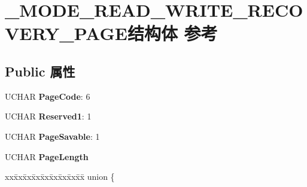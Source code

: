 \hypertarget{struct___m_o_d_e___r_e_a_d___w_r_i_t_e___r_e_c_o_v_e_r_y___p_a_g_e}{}\section{\+\_\+\+M\+O\+D\+E\+\_\+\+R\+E\+A\+D\+\_\+\+W\+R\+I\+T\+E\+\_\+\+R\+E\+C\+O\+V\+E\+R\+Y\+\_\+\+P\+A\+G\+E结构体 参考}
\label{struct___m_o_d_e___r_e_a_d___w_r_i_t_e___r_e_c_o_v_e_r_y___p_a_g_e}
\subsection*{Public 属性}
\begin{DoxyCompactItemize}
\item 
\mbox{\label{struct___m_o_d_e___r_e_a_d___w_r_i_t_e___r_e_c_o_v_e_r_y___p_a_g_e_a648291f6716c23a2b709e9ae1c104b01}} 
U\+C\+H\+AR {\bfseries Page\+Code}\+: 6
\item 
\mbox{\label{struct___m_o_d_e___r_e_a_d___w_r_i_t_e___r_e_c_o_v_e_r_y___p_a_g_e_ace117898b2d24fd6aeb8dc79e54c7b85}} 
U\+C\+H\+AR {\bfseries Reserved1}\+: 1
\item 
\mbox{\label{struct___m_o_d_e___r_e_a_d___w_r_i_t_e___r_e_c_o_v_e_r_y___p_a_g_e_a228df0011ede1443fd39cd00108b376f}} 
U\+C\+H\+AR {\bfseries Page\+Savable}\+: 1
\item 
\mbox{\label{struct___m_o_d_e___r_e_a_d___w_r_i_t_e___r_e_c_o_v_e_r_y___p_a_g_e_a677fd211d27cd9ca67e4223be0853597}} 
U\+C\+H\+AR {\bfseries Page\+Length}
\item 
\mbox{\label{struct___m_o_d_e___r_e_a_d___w_r_i_t_e___r_e_c_o_v_e_r_y___p_a_g_e_ae219b28fe32cb6c849da3ae8d8f2a169}} 
\begin{tabbing}
xx\=xx\=xx\=xx\=xx\=xx\=xx\=xx\=xx\=\kill
union \{\\

\end{tabbing}
\end{DoxyCompactItemize}
